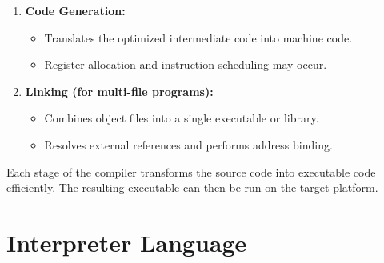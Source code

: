 \begin{enumerate}
    \item \textbf{Code Generation:}
    \begin{itemize}
        \item Translates the optimized intermediate code into machine code.
        \item Register allocation and instruction scheduling may occur.
    \end{itemize}
    \item \textbf{Linking (for multi-file programs):}
    \begin{itemize}
        \item Combines object files into a single executable or library.
        \item Resolves external references and performs address binding.
    \end{itemize}
\end{enumerate}

Each stage of the compiler transforms the source code into executable code efficiently. The resulting executable can then be run on the target platform.

\section{Interpreter Language}


